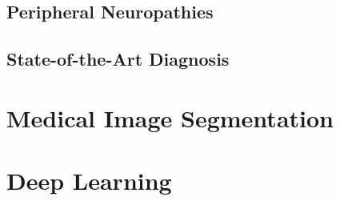 \subsection{Peripheral Neuropathies}

\subsection{State-of-the-Art Diagnosis}

\section{Medical Image Segmentation}

\section{Deep Learning}

